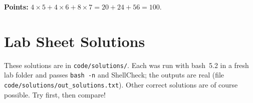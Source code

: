 \documentclass[11pt,a4paper]{article}
\newcommand{\cmd}[1]{\texttt{#1}}
\begin{document}
\textbf{Points:} $4 \times 5 + 4 \times 6 + 8 \times 7 = 20 + 24 + 56 = 100$.

\section{Lab Sheet Solutions}

These solutions are in \texttt{code/solutions/}. Each was run with bash~5.2 in a fresh lab folder and passes \cmd{bash -n} and ShellCheck; the outputs are real (file \texttt{code/solutions/out\_solutions.txt}). Other correct solutions are of course possible. Try first, then compare!

\newcommand{\sol}[4]{\Needspace{6\baselineskip}\par\smallskip{\headfont\bfseries\color{mintdeep}#1}}
\end{document}
